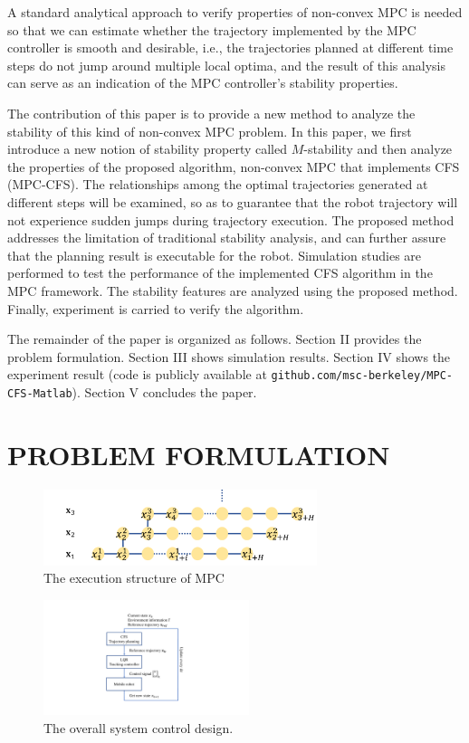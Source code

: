 \documentclass[letterpaper, 10 pt, conference]{ieeeconf}  %
\begin{document}
A standard analytical approach to verify properties of non-convex MPC is needed so that we can estimate whether the trajectory implemented by the MPC controller is smooth and desirable, i.e., the trajectories planned at different time steps do not jump around multiple local optima, and the result of this analysis can serve as an indication of the MPC controller’s stability properties.

The contribution of this paper is to provide a new method to analyze the stability of this kind of non-convex MPC problem. In this paper, we first introduce a new notion of stability property called $M$-stability and then analyze the properties of the proposed algorithm,  non-convex MPC that implements CFS (MPC-CFS). The relationships among the optimal trajectories generated at different steps will be examined, so as to guarantee that the robot trajectory will not experience sudden jumps during trajectory execution. The proposed method addresses the limitation of traditional stability analysis, and can further assure that the planning result is executable for the robot. Simulation studies are performed to test the performance of the implemented CFS  algorithm in the MPC framework. The stability features are analyzed using the proposed method. Finally, experiment is carried to verify the algorithm.

The remainder of the paper is organized as follows. Section II provides the problem formulation. Section III shows simulation results. Section IV shows the experiment result (code is publicly available at {\tt\small github.com/msc-berkeley/MPC-CFS-Matlab}). Section V concludes the paper.

\section{PROBLEM FORMULATION}

\begin{figure}[t]
\begin{center}
\includegraphics[width=8cm]{src/MPCstruc.png}
\caption{The execution structure of MPC}
\label{fig: mpc}
\end{center}
\end{figure}

\begin{figure}[t]
      \centering
      \includegraphics[width=6cm]{plot/MPCsystem.pdf}
      \caption{The overall system control design. }
      \label{fig:MPCsystem}
\end{figure}
\end{document}
